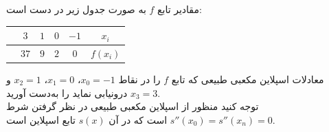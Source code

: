 مقادیر تابع 
\(f\)
به صورت جدول زیر در دست است:
\begin{center}
	\begin{tabular}{ccccc|c}
		& \(3\) &\(1\)&\(0\) & \(-1\) & \(x_i\)\\
		\hline
		& \(37\) & \(9\) & \(2\) &\(0\) & \(f(x_i)\)
	\end{tabular}
\end{center}
معادلات اسپلاین مکعبی طبیعی که تابع 
\(f\)
را در نقاط
\(x_0=-1\)،
\(x_1=0\)،
\(x_2=1\) 
و  
\(x_3=3\)
درونیابی نماید را به‌دست آورید.\\
توجه کنید منظور از اسپلاین مکعبی طبیعی در نظر گرفتن شرط
\(s''(x_0) = s''(x_n) = 0\)
است که در آن
\(s(x)\)
تابع اسپلاین است. 
